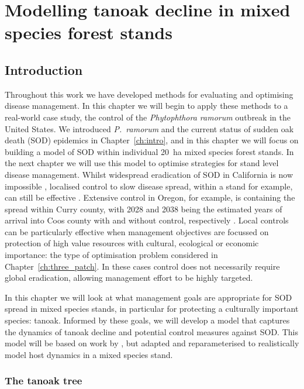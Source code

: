 %
\chapter{Modelling tanoak decline in mixed species forest stands\label{ch:protect_tanoak_model}}

\section{Introduction\label{sec:ch5:Intro}}

Throughout this work we have developed methods for evaluating and optimising disease management. In this chapter we will begin to apply these methods to a real-world case study, the control of the \textit{Phytophthora ramorum} outbreak in the United States. We introduced \textit{P.~ramorum} and the current status of sudden oak death (SOD) epidemics in Chapter~\ref{ch:intro}, and in this chapter we will focus on building a model of SOD within individual \SI{20}{\hectare} mixed species forest stands. In the next chapter we will use this model to optimise strategies for stand level disease management. Whilst widespread eradication of SOD in California is now impossible \citep{cunniffe_modelling_2016}, localised control to slow disease spread, within a stand for example, can still be effective \citep{hansen_efficacy_2019}. Extensive control in Oregon, for example, is containing the spread within Curry county, with 2028 and 2038 being the estimated years of arrival into Coos county with and without control, respectively \citep{sod_economics_assessment}. Local controls can be particularly effective when management objectives are focussed on protection of high value resources with cultural, ecological or economic importance: the type of optimisation problem considered in Chapter~\ref{ch:three_patch}. In these cases control does not necessarily require global eradication, allowing management effort to be highly targeted.

In this chapter we will look at what management goals are appropriate for SOD spread in mixed species stands, in particular for protecting a culturally important species: tanoak. Informed by these goals, we will develop a model that captures the dynamics of tanoak decline and potential control measures against SOD. This model will be based on work by \citet{cobb_ecosystem_2012}, but adapted and reparameterised to realistically model host dynamics in a mixed species stand.

\subsection{The tanoak tree}

